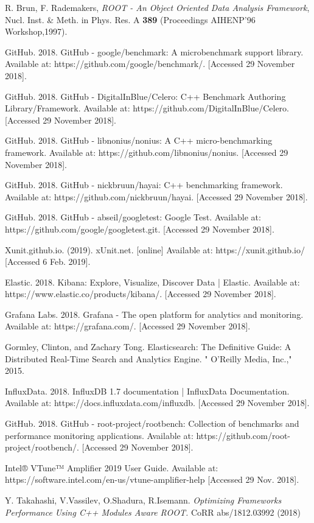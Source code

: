 \documentclass{webofc}
\begin{document}
\begin{thebibliography}{plain}

R. Brun, F. Rademakers, \textit{ROOT - An Object Oriented Data Analysis Framework}, Nucl. Inst. \& Meth. in Phys. Res. A  \textbf{389} (Proceedings AIHENP'96 Workshop,1997).

GitHub. 2018. GitHub - google/benchmark: A microbenchmark support library. Available at: https://github.com/google/benchmark/. [Accessed 29 November 2018].

GitHub. 2018. GitHub - DigitalInBlue/Celero: C++ Benchmark Authoring Library/Framework. Available at: https://github.com/DigitalInBlue/Celero. [Accessed 29 November 2018].

 GitHub. 2018. GitHub - libnonius/nonius: A C++ micro-benchmarking framework. Available at: https://github.com/libnonius/nonius. [Accessed 29 November 2018].
 
 GitHub. 2018. GitHub - nickbruun/hayai: C++ benchmarking framework. Available at: https://github.com/nickbruun/hayai. [Accessed 29 November 2018].
 
GitHub. 2018. GitHub - abseil/googletest: Google Test. Available at: https://github.com/google/googletest.git. [Accessed 29 November 2018].
 
 Xunit.github.io. (2019). xUnit.net. [online] Available at: https://xunit.github.io/ [Accessed 6 Feb. 2019].
 
 Elastic. 2018. Kibana: Explore, Visualize, Discover Data | Elastic. Available at: https://www.elastic.co/products/kibana/. [Accessed 29 November 2018].
 
Grafana Labs. 2018. Grafana - The open platform for analytics and monitoring. Available at: https://grafana.com/. [Accessed 29 November 2018].
 
 Gormley, Clinton, and Zachary Tong. Elasticsearch: The Definitive Guide: A Distributed Real-Time Search and Analytics Engine. " O'Reilly Media, Inc.," 2015.
 
InfluxData. 2018. InfluxDB 1.7 documentation | InfluxData Documentation. Available at: https://docs.influxdata.com/influxdb. [Accessed 29 November 2018].

GitHub. 2018. GitHub - root-project/rootbench: Collection of benchmarks and performance monitoring applications. Available at: https://github.com/root-project/rootbench/. [Accessed 29 November 2018].

Intel® VTune™ Amplifier 2019 User Guide. Available at: https://software.intel.com/en-us/vtune-amplifier-help [Accessed 29 Nov. 2018].

Y. Takahashi, V.Vassilev, O.Shadura, R.Isemann. \textit{Optimizing Frameworks Performance Using C++ Modules Aware ROOT.} CoRR abs/1812.03992 (2018)

\end{thebibliography}
\end{document}
